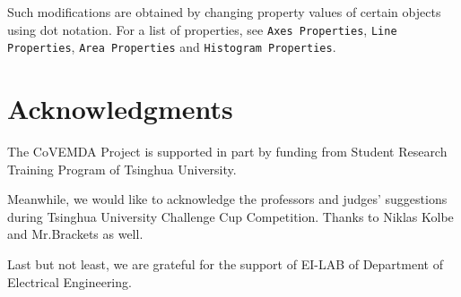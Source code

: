 \documentclass[10pt]{article}
\newcommand{\covemda}{CoVEMDA}
\numberwithin{equation}{section}
\numberwithin{table}{section}
\numberwithin{figure}{section}
\begin{document}
Such modifications are obtained by changing property values of certain objects using dot notation. For a list of properties, see \verb!Axes Properties!, \verb!Line Properties!, \verb!Area Properties! and \verb!Histogram Properties!.







\newpage
\section{Acknowledgments} \label{sec:thanks}

The \covemda{} Project is supported in part by funding from Student Research Training Program of Tsinghua University.

Meanwhile, we would like to acknowledge the professors and judges' suggestions during Tsinghua University Challenge Cup Competition. Thanks to Niklas Kolbe and Mr.Brackets as well.

Last but not least, we are grateful for the support of EI-LAB of Department of Electrical Engineering.
\end{document}
